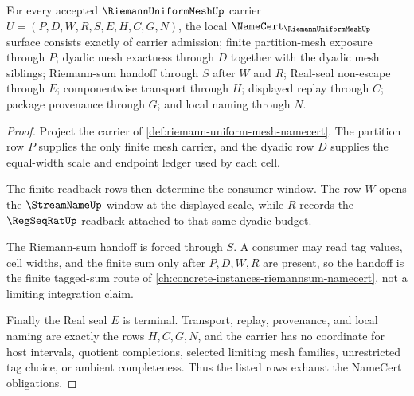 \begin{theorem}
\label{thm:riemann-uniform-mesh-namecert-obligations}
For every accepted $\RiemannUniformMeshUp$ carrier $U=(P,D,W,R,S,E,H,C,G,N)$, the local $\NameCert_{\RiemannUniformMeshUp}$ surface consists exactly of carrier admission; finite partition-mesh exposure through $P$; dyadic mesh exactness through $D$ together with the dyadic mesh siblings; Riemann-sum handoff through $S$ after $W$ and $R$; Real-seal non-escape through $E$; componentwise transport through $H$; displayed replay through $C$; package provenance through $G$; and local naming through $N$.
\end{theorem}
\begin{proof}
Project the carrier of \autoref{def:riemann-uniform-mesh-namecert}. The partition row $P$ supplies the only finite mesh carrier, and the dyadic row $D$ supplies the equal-width scale and endpoint ledger used by each cell.

The finite readback rows then determine the consumer window. The row $W$ opens the $\StreamNameUp$ window at the displayed scale, while $R$ records the $\RegSeqRatUp$ readback attached to that same dyadic budget.

The Riemann-sum handoff is forced through $S$. A consumer may read tag values, cell widths, and the finite sum only after $P,D,W,R$ are present, so the handoff is the finite tagged-sum route of \autoref{ch:concrete-instances-riemannsum-namecert}, not a limiting integration claim.

Finally the Real seal $E$ is terminal. Transport, replay, provenance, and local naming are exactly the rows $H,C,G,N$, and the carrier has no coordinate for host intervals, quotient completions, selected limiting mesh families, unrestricted tag choice, or ambient completeness. Thus the listed rows exhaust the NameCert obligations.
\end{proof}



